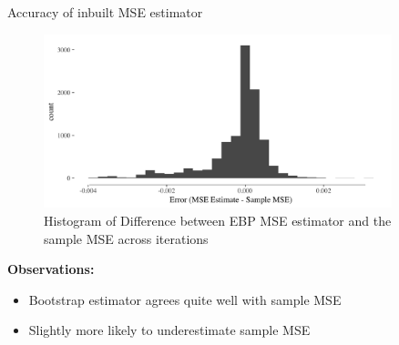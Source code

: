 \documentclass[fleqn,final]{beamer}
\newcommand{\Pheight}{\rule[-5mm]{0cm}{1cm}}
\begin{document}
\begin{frame}
\begin{columns}[t]
\begin{column}{.3\linewidth}
  \begin{block}{ Accuracy of inbuilt MSE estimator \Pheight}
	\begin{center}
	\begin{figure}
		\includegraphics[width=0.9\textwidth]{HistogramMSEEstimate}
		\caption{Histogram of Difference between EBP MSE estimator and the sample MSE across iterations}
	\end{figure}
\end{center}
   \end{block}
\textbf{Observations:}
\begin{itemize}
	\item Bootstrap estimator agrees quite well with sample MSE
	\item Slightly more likely to underestimate sample MSE
\end{itemize}

\end{column}

%
%

\end{columns}

\end{frame}
\end{document}

